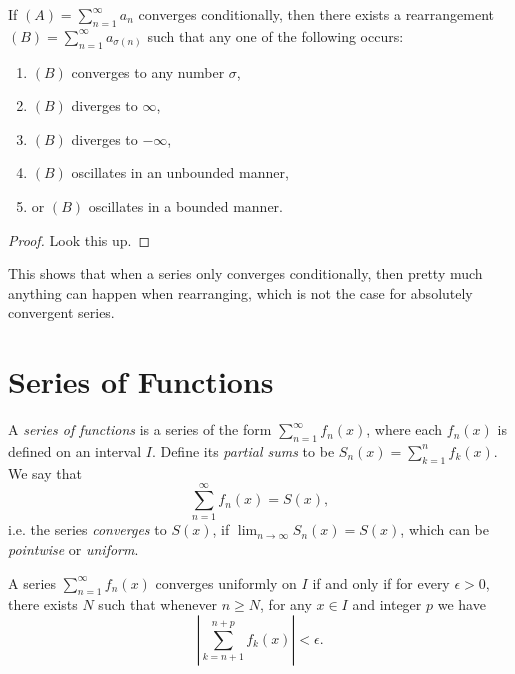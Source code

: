 \begin{theorem}[Riemann]
  If $(A) = \sum_{n = 1}^\infty a_n$ converges
  conditionally, then there exists a rearrangement
  $(B) = \sum_{n = 1}^\infty a_{\sigma(n)}$ such that
  any one of the following occurs:
  \begin{enumerate}
    \item $(B)$ converges to any number $\sigma$,
    \item $(B)$ diverges to $\infty$,
    \item $(B)$ diverges to $-\infty$,
    \item $(B)$ oscillates in an unbounded manner,
    \item or $(B)$ oscillates in a bounded manner.
  \end{enumerate}
\end{theorem}

\begin{proof}
  Look this up.
\end{proof}

\begin{remark}
  This shows that when a series only converges
  conditionally, then pretty much anything can happen
  when rearranging, which is not the case for
  absolutely convergent series.
\end{remark}

\section{Series of Functions}
\begin{definition}
  A \emph{series of functions} is a series of the form
  $\sum_{n = 1}^\infty f_n(x)$, where each $f_n(x)$
  is defined on an interval $I$. Define its
  \emph{partial sums} to be $S_n(x) = \sum_{k = 1}^n f_k(x)$.
  We say that
  \[
    \sum_{n = 1}^\infty f_n(x) = S(x),
  \]
  i.e. the series \emph{converges} to $S(x)$, if
  $\lim_{n \to \infty} S_n(x) = S(x)$, which can be
  \emph{pointwise} or \emph{uniform}.
\end{definition}

\begin{theorem}
  A series $\sum_{n = 1}^\infty f_n(x)$ converges
  uniformly on $I$ if and only if for every
  $\epsilon > 0$, there exists $N$ such that whenever
  $n \ge N$, for any $x \in I$ and integer $p$ we have
  \[
    \left| \sum_{k = n + 1}^{n + p} f_k(x) \right| < \epsilon.
  \]
\end{theorem}

